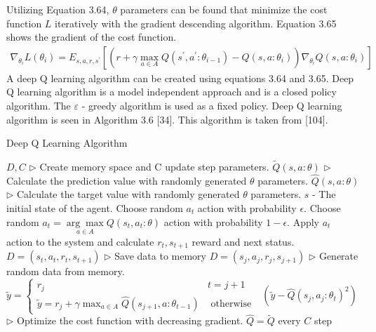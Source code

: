\documentclass[12pt,twoside,a4]{mwbk}
\begin{document}
Utilizing Equation 3.64, $\theta$ parameters can be found that minimize the cost function $L$ iteratively with the gradient descending algorithm. Equation 3.65 shows the gradient of the cost function.
\begin{subequations}
\begin{align}
    \nabla_{\theta_{i}} L\left(\theta_{i}\right)=E_{s, a, r, s^{\prime}}\left[\left(r+\gamma \max _{a \in A} Q\left(s^{\prime}, a^{\prime}: \theta_{i-1}\right)-Q\left(s, a: \theta_{i}\right)\right) \nabla_{\theta_{i}} Q\left(s, a: \theta_{i}\right)\right]
\end{align}
\end{subequations}
A deep Q learning algorithm can be created using equations 3.64 and 3.65. Deep Q learning algorithm is a model independent approach and is a closed policy algorithm. The $\varepsilon$ - greedy algorithm is used as a fixed policy. Deep Q learning algorithm is seen in Algorithm 3.6 [34]. This algorithm is taken from [104].
\begin{algorithm}
\caption{Deep Q Learning Algorithm}
\begin{algorithmic}[1]
\State $D, C$ $\triangleright$ Create memory space and C update step parameters.
\State $\tilde{Q}(s,a:\theta )$ $\triangleright$ Calculate the prediction value with randomly generated $\theta$ parameters.
\State $\hat{Q}(s,a:\theta )$ $\triangleright$ Calculate the target value with randomly generated $\theta$ parameters.
    \State $s$ - The initial state of the agent.
        \State Choose random $a_t$ action with probability $\epsilon$.
        \State Choose random $a_t = \underset{a \in A} {\arg \max } Q (s_t, a_t:\theta)$ action with probability $1 - \epsilon$.
        \State Apply $a_t$ action to the system and calculate $r_t, s_{t+1}$ reward and next status.
        \State $D = (s_t, a_t, r_t, s_{t+1})$ $\triangleright$ Save data to memory
        \State $D = (s_j, a_j, r_j, s_{j+1})$ $\triangleright$ Generate random data from memory.
        \State $\tilde{y}=\left\{\begin{array}{cc}
        r_j & t = j + 1 \\
        \tilde{y}=r_{j}+\gamma \max _{a \in A} \hat{Q}\left(s_{j+1}, a: \theta_{t-1}\right) & \text { otherwise }
        \end{array}\right.$
        \State $(\tilde{y}-\hat{Q}(s_j,a_j:\theta_t)^2)$ $\triangleright$ Optimize the cost function with decreasing gradient.
        \State $\hat{Q} = \tilde{Q}$ every $C$ step
    \EndFor
\EndFor
\end{algorithmic}
\end{algorithm}
\newpage
\end{document}
